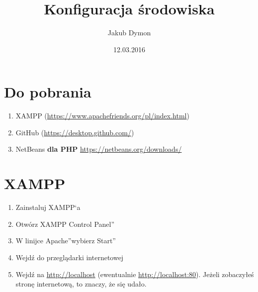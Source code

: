 \documentclass[a4paper, 11pt]{article}
\title{Konfiguracja środowiska}
\author{Jakub Dymon}
\date{12.03.2016}
\begin{document}
	\maketitle
	\section{Do pobrania}
	\begin{enumerate}
		\item XAMPP (\url{https://www.apachefriends.org/pl/index.html})
		\item GitHub (\url{https://desktop.github.com/})
		\item NetBeans \textbf{dla PHP} {\url{https://netbeans.org/downloads/}}
	\end{enumerate}
	\section{XAMPP}
	\begin{enumerate}
		\item Zainstaluj XAMPP`a
		\item Otwórz \quotedblbase XAMPP Control Panel\textquotedblright
		\item W linijce \quotedblbase Apache\textquotedblright wybierz \quotedblbase Start\textquotedblright
		\item Wejdź do przeglądarki internetowej
		\item Wejdź na \url{http://localhost} (ewentualnie \url{http://localhost:80}). Jeżeli zobaczyłeś stronę internetową, to znaczy, że się udało.
	\end{enumerate}
\end{document}
